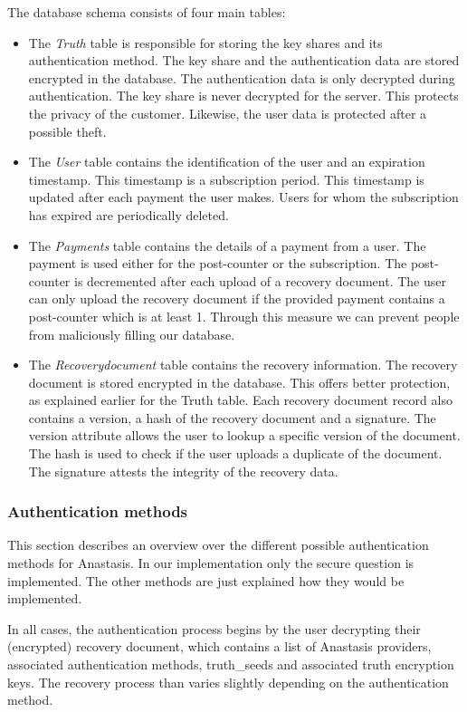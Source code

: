 The database schema consists of four main tables:

\begin{itemize}
\item The {\em Truth} table is responsible for storing the key shares and
  its authentication method. The key share and the authentication data are stored
  encrypted in the database. The authentication data is only decrypted during
  authentication. The key share is never decrypted for the
  server. This protects the privacy of the customer. Likewise, the
  user data is protected after a possible theft.
\item The {\em User} table contains the identification of the user and an
  expiration timestamp. This timestamp is a subscription period. This
  timestamp is updated after each payment the user makes. Users for
  whom the subscription has expired are periodically deleted.
\item The {\em Payments} table contains the details of a payment from a
  user. The payment is used either for the post-counter or the
  subscription. The post-counter is decremented after each upload of a
  recovery document. The user can only upload the recovery document if
  the provided payment contains a post-counter which is at least 1.
  Through this measure we can prevent people from maliciously filling
  our database.
\item The {\em Recoverydocument} table contains the recovery
  information. The recovery document is stored encrypted in the
  database. This offers better protection, as explained earlier for
  the Truth table. Each recovery document record also contains a
  version, a hash of the recovery document and a signature. The
  version attribute allows the user to lookup a specific version of
  the document. The hash is used to check if the user uploads a
  duplicate of the document. The signature attests the
  integrity of the recovery data.
\end{itemize}


\subsubsection{Authentication methods}

This section describes an overview over the different possible
authentication methods for Anastasis. In our implementation only the
secure question is implemented. The other methods are just explained
how they would be implemented.

In all cases, the authentication process begins by the user decrypting
their (encrypted) recovery document, which contains a list of Anastasis
providers, associated authentication methods, truth\_seeds and associated
truth encryption keys.  The recovery process than varies slightly
depending on the authentication method.

